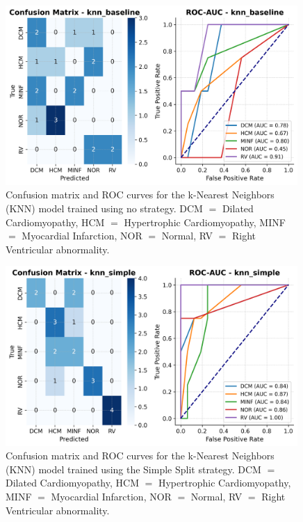 \begin{figure}
	\begin{center}
		\includegraphics[width=0.99\textwidth]{../images/metrics/knn/knn_baseline_metrics.png}
	\end{center}
	\caption{Confusion matrix and ROC curves for the k-Nearest Neighbors (KNN)
		model trained using no strategy. DCM $=$ Dilated Cardiomyopathy, HCM $=$
		Hypertrophic Cardiomyopathy, MINF $=$ Myocardial Infarction, NOR $=$ Normal, RV
		$=$ Right Ventricular abnormality.}
\end{figure}

\begin{figure}
	\begin{center}
		\includegraphics[width=0.99\textwidth]{../images/metrics/knn/knn_simple_metrics.png}
	\end{center}
	\caption{Confusion matrix and ROC curves for the k-Nearest Neighbors (KNN)
		model trained using the Simple Split strategy. DCM $=$ Dilated
		Cardiomyopathy, HCM $=$ Hypertrophic Cardiomyopathy, MINF $=$ Myocardial
		Infarction, NOR $=$ Normal, RV $=$ Right Ventricular abnormality.}
\end{figure}

